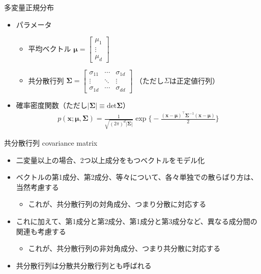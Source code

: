 \documentclass[aspectratio=169,unicode,dvipdfmx,14pt]{beamer}
\begin{document}
\begin{frame}{多変量正規分布}
\begin{itemize}
\item パラメータ
\begin{itemize}
\item 平均ベクトル
$\bm{\mu} = \begin{bmatrix} \mu_1 \\ \vdots \\ \mu_d \end{bmatrix}$
\item 共分散行列
$\bm{\Sigma} = \begin{bmatrix} \sigma_{11} & \cdots & \sigma_{1d} \\ 
\vdots & \ddots & \vdots \\
\sigma_{1d} & \cdots & \sigma_{dd} \end{bmatrix}$
（ただし$\Sigma$は正定値行列）
\end{itemize}
\item 確率密度関数（ただし$| \bm{\Sigma} | \equiv \mbox{det}\bm{\Sigma}$）
\begin{align}
p(\bm{x};\bm{\mu},\bm{\Sigma}) = \frac{1}{\sqrt{(2\pi)^d|\bm{\Sigma}|}}\exp\bigg\{ - \frac{(\bm{x} - \bm{\mu})^\intercal \bm{\Sigma}^{-1} (\bm{x} -\bm{\mu})}{2} \bigg\}
\end{align}
\end{itemize}
\end{frame}

\begin{frame}{共分散行列 covariance matrix}
\begin{itemize}
\item 二変量以上の場合、2つ以上成分をもつベクトルをモデル化
\item ベクトルの第1成分、第2成分、等々について、各々単独での散らばり方は、当然考慮する
\begin{itemize}
\item これが、共分散行列の対角成分、つまり分散に対応する
\end{itemize}
\item これに加えて、第1成分と第2成分、第1成分と第3成分など、異なる成分間の関連も考慮する
\begin{itemize}
\item これが、共分散行列の非対角成分、つまり共分散に対応する
\end{itemize}
\item 共分散行列は分散共分散行列とも呼ばれる
\end{itemize}
\end{frame}
\end{document}
